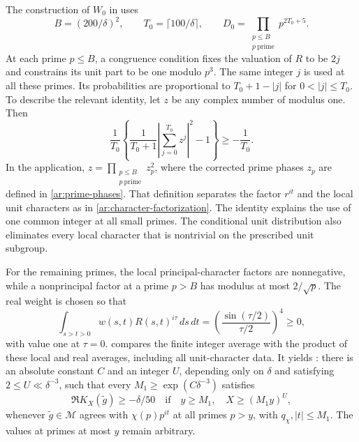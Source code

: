 \documentclass[twoside]{aomart}
\theoremstyle{paperplain}
\theoremstyle{paperdefinition}
\numberwithin{equation}{section}
\begin{document}
The construction of $W_0$ in  uses
\begin{equation*}
 B=(200/\delta)^2,\qquad T_0=\lceil100/\delta\rceil,
 \qquad D_0=\prod_{\substack{p\le B\\p\ \mathrm{prime}}}p^{2T_0+5}.
\end{equation*}
At each prime $p\le B$, a congruence condition fixes the valuation
of $R$ to be $2j$ and constrains its unit part to be one modulo
$p^3$. The same integer $j$ is used at all these primes. Its
probabilities are proportional to $T_0+1-|j|$ for
$0<|j|\le T_0$. To describe the relevant identity, let $z$ be
any complex number of modulus one. Then
\begin{equation*}
 \frac1{T_0}\left\{
       \frac1{T_0+1}\left|\sum_{j=0}^{T_0}z^j\right|^2-1
       \right\}\ge-\frac1{T_0}.
\end{equation*}
In the application, $\displaystyle z=\prod_{\substack{p\le B\\p\ \mathrm{prime}}}z_p^2$, where the corrected
prime phases $z_p$ are defined in \eqref{ar:prime-phases}.
That definition separates the factor $r^{it}$ and the local unit
characters as in \eqref{ar:character-factorization}.
The identity explains the use of one common integer at all small
primes. The conditional unit distribution also eliminates every
local character that is nontrivial on the prescribed unit subgroup.

For the remaining primes, the local principal-character factors
are nonnegative, while a nonprincipal factor at a prime $p>B$
has modulus at most $2/\sqrt p$. The real weight is chosen so that
\begin{equation*}
 \int_{s>t>0}w(s,t)R(s,t)^{i\tau}\,ds\,dt
 =\left(\frac{\sin(\tau/2)}{\tau/2}\right)^4\ge0,
\end{equation*}
with value one at $\tau=0$.
 compares the finite integer average with the
product of these local and real averages, including all unit-character
data. It yields : there is an absolute
constant $C$ and an integer $U$, depending only on $\delta$ and
satisfying $2\le U\ll\delta^{-3}$, such that every
$M_1\ge\exp(C\delta^{-3})$ satisfies
\begin{equation}
 \Re K_X(\widetilde g)\ge-\delta/50
 \quad\text{if}\quad y\ge M_1,\quad X\ge(M_1y)^U,
 \label{fw:model-bound}
\end{equation}
whenever $\widetilde g\in\mathcal M$ agrees with
$\chi(p)p^{it}$ at all primes $p>y$, with $q_\chi,|t|\le M_1$.
The values at primes at most $y$ remain arbitrary.
\end{document}
